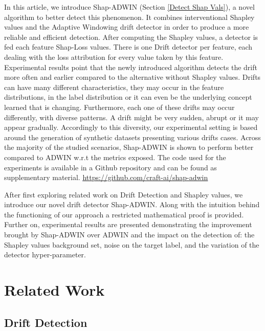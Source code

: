 \documentclass[runningheads]{llncs}
\begin{document}
In this article, we introduce Shap-ADWIN (Section \ref{Detect Shap Vals}), a novel algorithm to better detect this phenomenon. It combines interventional Shapley values and the Adaptive Windowing drift detector \cite{bifet_learning_2007} in order to produce a more reliable and efficient detection. After computing the Shapley values, a detector is fed each feature Shap-Loss values. There is one Drift detector per feature, each dealing with the loss attribution for every value taken by this feature.
Experimental results point that the newly introduced algorithm detects the drift more often and earlier compared to the alternative without Shapley values. 
Drifts can have many different characteristics, they may occur in the feature distributions, in the label distribution or it can even be the underlying concept learned that is changing. Furthermore, each one of these drifts may occur differently, with diverse patterns. A drift might be very sudden, abrupt or it may appear gradually. Accordingly to this diversity, our experimental setting is based around the generation of synthetic datasets presenting various drifts cases. Across the majority of the studied scenarios, Shap-ADWIN is shown to perform better compared to ADWIN w.r.t the metrics exposed. The code used for the experiments is available in a Github repository and can be found as supplementary material.   \textcolor{blue}{\underline{\url{https://github.com/craft-ai/shap-adwin}}}

After first exploring related work on Drift Detection and Shapley values, we introduce our novel drift detector Shap-ADWIN. Along with the intuition behind the functioning of our approach a restricted mathematical proof is provided. Further on, experimental results are presented demonstrating the improvement brought by Shap-ADWIN over ADWIN and the impact on the detection of: the Shapley values background set, noise on the target label, and the variation of the detector hyper-parameter.

\section{Related Work}

    \subsection{Drift Detection}
\end{document}
